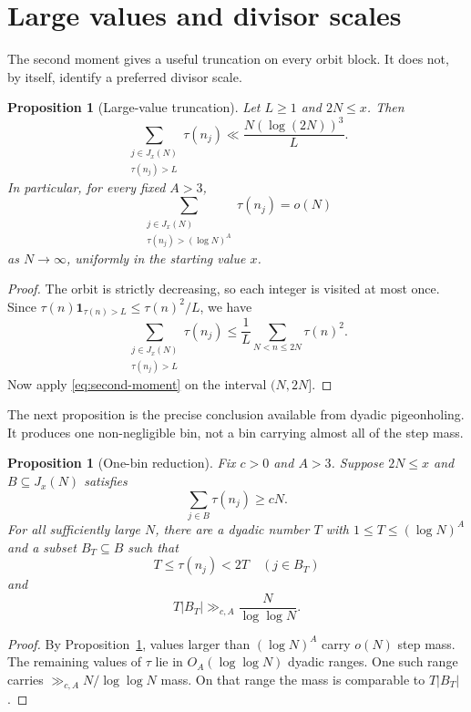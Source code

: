 \documentclass[11pt]{article}
\newtheorem{proposition}[theorem]{Proposition}
\theoremstyle{definition}
\theoremstyle{remark}
\newcommand{\one}{\mathbf{1}}
\begin{document}
\section{Large values and divisor scales}\label{sec:tails}

The second moment gives a useful truncation on every orbit block.  It
does not, by itself, identify a preferred divisor scale.

\begin{proposition}[Large-value truncation]\label{prop:tail}
Let $L\geq1$ and $2N\leq x$.  Then
\begin{equation}\label{eq:tail-general}
 \sum_{\substack{j\in J_x(N)\\ \tau(n_j)>L}}\tau(n_j)
 \ll \frac{N(\log(2N))^3}{L}.
\end{equation}
In particular, for every fixed $A>3$,
\[
 \sum_{\substack{j\in J_x(N)\\
                   \tau(n_j)>(\log N)^A}}
 \tau(n_j)=o(N)
\]
as $N\to\infty$, uniformly in the starting value $x$.
\end{proposition}

\begin{proof}
The orbit is strictly decreasing, so each integer is visited at most
once.  Since
$\tau(n)\one_{\tau(n)>L}\leq\tau(n)^2/L$, we have
\[
 \sum_{\substack{j\in J_x(N)\\ \tau(n_j)>L}}\tau(n_j)
 \leq\frac1L\sum_{N<n\leq2N}\tau(n)^2.
\]
Now apply \eqref{eq:second-moment} on the interval $(N,2N]$.
\end{proof}

The next proposition is the precise conclusion available from dyadic
pigeonholing.  It produces one non-negligible bin, not a bin carrying
almost all of the step mass.

\begin{proposition}[One-bin reduction]\label{prop:one-bin}
Fix $c>0$ and $A>3$.  Suppose $2N\leq x$ and
$B\subseteq J_x(N)$ satisfies
\[
 \sum_{j\in B}\tau(n_j)\geq cN.
\]
For all sufficiently large $N$, there are a dyadic number $T$ with
$1\leq T\leq(\log N)^A$ and a subset $B_T\subseteq B$ such that
\[
 T\leq\tau(n_j)<2T\quad(j\in B_T)
\]
and
\begin{equation}\label{eq:one-bin}
 T|B_T|\gg_{c,A}\frac{N}{\log\log N}.
\end{equation}
\end{proposition}

\begin{proof}
By Proposition~\ref{prop:tail}, values larger than $(\log N)^A$ carry
$o(N)$ step mass.  The remaining values of $\tau$ lie in
$O_A(\log\log N)$ dyadic ranges.  One such range carries
$\gg_{c,A}N/\log\log N$ mass.  On that range the mass is comparable to
$T|B_T|$.
\end{proof}
\end{document}
